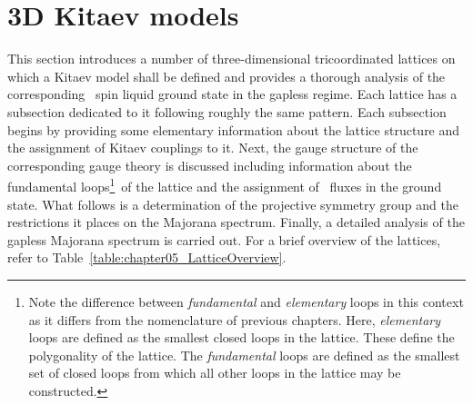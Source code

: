 %
%
\section{3D Kitaev models}
\label{section:chapter05_3DKitaevModels}
%
%
This section introduces a number of three-dimensional tricoordinated lattices on which a Kitaev model shall be defined and provides a thorough analysis of the corresponding \ZZ~spin liquid ground state in the gapless regime.
Each lattice has a subsection dedicated to it following roughly the same pattern.
Each subsection begins by providing some elementary information about the lattice structure and the assignment of Kitaev couplings to it.
Next, the gauge structure of the corresponding gauge theory is discussed including information about the fundamental loops\footnote{Note the difference between \textit{fundamental} and \textit{elementary} loops in this context as it differs from the nomenclature of previous chapters. Here, \textit{elementary} loops are defined as the smallest closed loops in the lattice. These define the polygonality of the lattice. The \textit{fundamental} loops are defined as the smallest set of closed loops from which all other loops in the lattice may be constructed.}~of the lattice and the assignment of \ZZ~fluxes in the ground state.
What follows is a determination of the projective symmetry group and the restrictions it places on the Majorana spectrum.
Finally, a detailed analysis of the gapless Majorana spectrum is carried out.
For a brief overview of the lattices, refer to Table~\ref{table:chapter05_LatticeOverview}.
%
